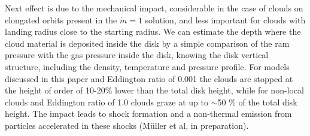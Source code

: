 \documentclass[twocolumn]{aastex62}
\begin{document}
Next effect is due to the mechanical impact, considerable in the case of clouds on elongated orbits present in the $\dot m = 1$ solution, and less important for clouds with landing radius close to the starting radius. We can estimate the depth where the cloud material is deposited inside the disk by a simple comparison of the ram pressure with the gas pressure inside the disk, knowing the disk vertical structure, including the density, temperature and pressure profile. For models discussed in this paper and Eddington ratio of 0.001 the clouds are stopped at the height of order of 10-20\% lower than the total disk height, while for non-local clouds and Eddington ratio of 1.0 clouds graze at up to $\sim$50 \% of the total disk height. The impact leads to shock formation and a non-thermal emission from particles accelerated in these shocks (M\"uller et al, in preparation).  
\end{document}

